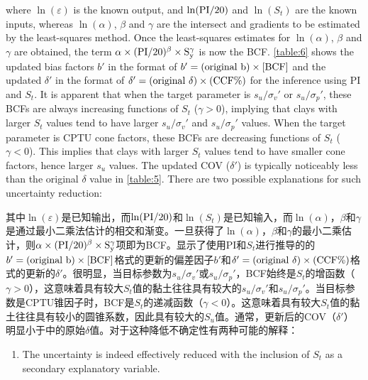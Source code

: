 \begin{paracol}{2}

    where $\ln(\varepsilon)$ is the known output, and $\ln(\rm{PI}/20)$ and $\ln(S_t)$ are the known inputs, whereas $\ln(\alpha)$, $\beta$ and $\gamma$ are the intersect and gradients to be estimated by the least-squares method. Once the least-squares estimates for $\ln(\alpha)$, $\beta$ and $\gamma$ are obtained, the term $\alpha\times{}(\rm{PI}/20)^\beta\times{}S_y^\gamma$ is now the BCF. \autoref{table:6} shows the updated bias factors $b'$ in the format of $b'=(\rm{original}~b)\times{}[BCF]$ and the updated $\delta'$ in the format of $\delta'=(\rm{original}~\delta)\times{}(\rm{CCF}\%)$ for the inference using PI and $S_t$. It is apparent that when the target parameter is $s_u/\sigma_v'$ or $s_u/\sigma_p'$, these BCFs are always increasing functions of $S_t$ ($\gamma>0$), implying that clays with larger $S_t$ values tend to have larger $s_u/\sigma_v'$ and $s_u/\sigma_p'$ values. When the target parameter is CPTU cone factors, these BCFs are decreasing functions of $S_t$ ($\gamma<0$). This implies that clays with larger $S_t$ values tend to have smaller cone factors, hence larger $s_u$ values. The updated COV ($\delta'$) is typically noticeably less than the original $\delta$ value in \autoref{table:5}. There are two possible explanations for such uncertainty reduction:

    \switchcolumn

    其中$\ln(\varepsilon)$是已知输出，而$\ln(\rm{PI}/20)$和$\ln(S_t)$是已知输入，而$\ln(\alpha)$，$\beta$和$\gamma$是通过最小二乘法估计的相交和渐变。一旦获得了$\ln(\alpha)$，$\beta$和$\gamma$的最小二乘估计，则$\alpha\times{}(\rm{PI}/20)^\beta\times{}S_y^\gamma$项即为BCF。显示了使用PI和$S_t$进行推导的的$b'=(\rm{original}~b)\times{}[BCF]$格式的更新的偏差因子$b'$和$\delta'=(\rm{original}~\delta)\times{}(\rm{CCF}\%)$格式的更新的$\delta'$。很明显，当目标参数为$s_u/\sigma_v'$或$s_u/\sigma_p'$，BCF始终是$S_t$的增函数（$\gamma>0$），这意味着具有较大$S_t$值的黏土往往具有较大的$s_u/\sigma_v'$和$s_u/\sigma_p'$。当目标参数是CPTU锥因子时，BCF是$S_t$的递减函数（$\gamma<0$）。这意味着具有较大$S_t$值的黏土往往具有较小的圆锥系数，因此具有较大的$S_u$值。通常，更新后的COV（$\delta'$）明显小于中的原始$\delta$值。对于这种降低不确定性有两种可能的解释：

    \switchcolumn*
    \begin{enumerate}
        \item The uncertainty is indeed effectively reduced with the inclusion of $S_t$ as a secondary explanatory variable.
        

\end{enumerate}
\end{paracol}
